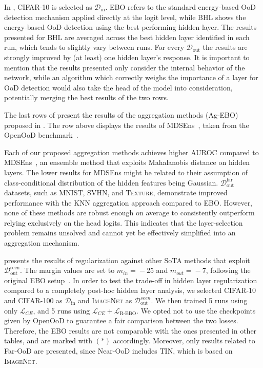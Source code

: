 \documentclass[10pt,twocolumn,a4paper]{article}
\newcommand{\minisection}[1]{\vspace{0.03in} \noindent {\bf #1}}
\begin{document}
In , \textsc{CIFAR-10} is selected as $\mathcal{D}_{\text{in}}$. EBO refers to the standard energy-based OoD detection mechanism applied directly at the logit level, while BHL shows the energy-based OoD detection using the best performing hidden layer. The results presented for BHL are averaged across the best hidden layer identified in each run, which tends to slightly vary between runs. For every $\mathcal{D}_{\text{out}}$ the results are strongly improved by (at least) one hidden layer's response. It is important to mention that the results presented only consider the internal behavior of the network, while an algorithm which correctly weighs the importance of a layer for OoD detection would also take the head of the model into consideration, potentially merging the best results of the two rows.

\minisection{Energy aggregation.}
The last rows of  present the results of the aggregation methods (Ag-EBO) proposed in . The row above displays the results of \mbox{MDSEns}~\cite{lee2018simple}, taken from the OpenOoD benchmark~\cite{zhang2024openood}.

\noindent Each of our proposed aggregation methods achieves higher AUROC compared to MDSEns~\cite{lee2018simple}, an ensemble method that exploits Mahalanobis distance on hidden layers. The lower results for MDSEns might be related to their assumption of class-conditional distribution of the hidden features being Gaussian. $\mathcal{D}_{\text{out}}^{\text{far}}$ datasets, such as \textsc{MNIST}, \textsc{SVHN}, and \textsc{Texture}, demonstrate improved performance with the KNN aggregation approach compared to EBO. However, none of these methods are robust enough on average to consistently outperform relying exclusively on the head logits. This indicates that the layer-selection problem remains unsolved and cannot yet be effectively simplified into an aggregation mechanism.

\minisection{Energy regularization.}
 presents the results of regularization against other SoTA methods that exploit $\mathcal{D}_{\text{out}}^{\text{seen}}$. The margin values are set to \mbox{$m_{in}\!\!=\!\!-25$} and \mbox{$m_{out}\!\!=\!\!-7$}, following the original EBO setup~\cite{liu2020energy}. In order to test the trade-off in hidden layer regularization compared to a completely post-hoc hidden layer analysis, we selected \textsc{CIFAR-10} and \textsc{CIFAR-100} as $\mathcal{D}_{\text{in}}$ and \textsc{ImageNet} as $\mathcal{D}_{\text{out}}^{seen}$. We then trained 5 runs using only $\mathcal{L}_{CE}$, and 5 runs using $\mathcal{L}_{CE} + \mathcal{L}_{\text{R-EBO}}$. We opted not to use the checkpoints given by OpenOoD to guarantee a fair comparison between the two losses. Therefore, the EBO results are not comparable with the ones presented in other tables, and are marked with $(*)$ accordingly. Moreover, only results related to Far-OoD are presented, since Near-OoD includes \textsc{TIN}, which is based on \textsc{ImageNet}.
\end{document}
